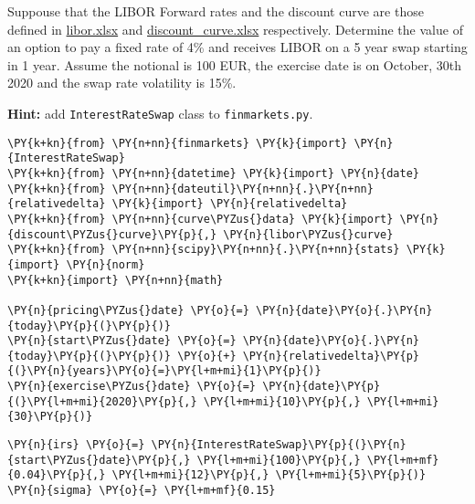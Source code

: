 \begin{Exercise}[title={(Swaption)}]
Suppouse that the LIBOR Forward rates and the discount curve are those defined in \href{https://drive.google.com/file/d/1dm5oZnZKmJM6UrV0L32OcqD5Tzs9SI9A/view?usp=sharing}{libor.xlsx} and \href{https://drive.google.com/file/d/14R22r7m-6VpQ_P79D3qHdK0QN_mOQ_UB/view?usp=sharing}{discount\_curve.xlsx} respectively.
Determine the value of an option to pay a fixed rate of 4\% and receives LIBOR on a 5 year swap starting in 1 year. Assume the notional is 100 EUR, the exercise date is on October, 30th 2020 and the swap rate volatility is 15\%.

\textbf{Hint:} add \texttt{InterestRateSwap} class to \texttt{finmarkets.py}.
\end{Exercise}

\begin{Answer}
\begin{tcolorbox}[size=fbox, boxrule=1pt, colback=cellbackground, colframe=cellborder]
\begin{Verbatim}[commandchars=\\\{\}]
\PY{k+kn}{from} \PY{n+nn}{finmarkets} \PY{k}{import} \PY{n}{InterestRateSwap}
\PY{k+kn}{from} \PY{n+nn}{datetime} \PY{k}{import} \PY{n}{date}
\PY{k+kn}{from} \PY{n+nn}{dateutil}\PY{n+nn}{.}\PY{n+nn}{relativedelta} \PY{k}{import} \PY{n}{relativedelta}
\PY{k+kn}{from} \PY{n+nn}{curve\PYZus{}data} \PY{k}{import} \PY{n}{discount\PYZus{}curve}\PY{p}{,} \PY{n}{libor\PYZus{}curve}
\PY{k+kn}{from} \PY{n+nn}{scipy}\PY{n+nn}{.}\PY{n+nn}{stats} \PY{k}{import} \PY{n}{norm}
\PY{k+kn}{import} \PY{n+nn}{math}

\PY{n}{pricing\PYZus{}date} \PY{o}{=} \PY{n}{date}\PY{o}{.}\PY{n}{today}\PY{p}{(}\PY{p}{)}
\PY{n}{start\PYZus{}date} \PY{o}{=} \PY{n}{date}\PY{o}{.}\PY{n}{today}\PY{p}{(}\PY{p}{)} \PY{o}{+} \PY{n}{relativedelta}\PY{p}{(}\PY{n}{years}\PY{o}{=}\PY{l+m+mi}{1}\PY{p}{)}
\PY{n}{exercise\PYZus{}date} \PY{o}{=} \PY{n}{date}\PY{p}{(}\PY{l+m+mi}{2020}\PY{p}{,} \PY{l+m+mi}{10}\PY{p}{,} \PY{l+m+mi}{30}\PY{p}{)}
\end{Verbatim}
\end{tcolorbox}

\begin{tcolorbox}[size=fbox, boxrule=1pt, colback=cellbackground, colframe=cellborder]
\begin{Verbatim}[commandchars=\\\{\}]
\PY{n}{irs} \PY{o}{=} \PY{n}{InterestRateSwap}\PY{p}{(}\PY{n}{start\PYZus{}date}\PY{p}{,} \PY{l+m+mi}{100}\PY{p}{,} \PY{l+m+mf}{0.04}\PY{p}{,} \PY{l+m+mi}{12}\PY{p}{,} \PY{l+m+mi}{5}\PY{p}{)}
\PY{n}{sigma} \PY{o}{=} \PY{l+m+mf}{0.15}


\end{Verbatim}
\end{tcolorbox}
\end{Answer}
